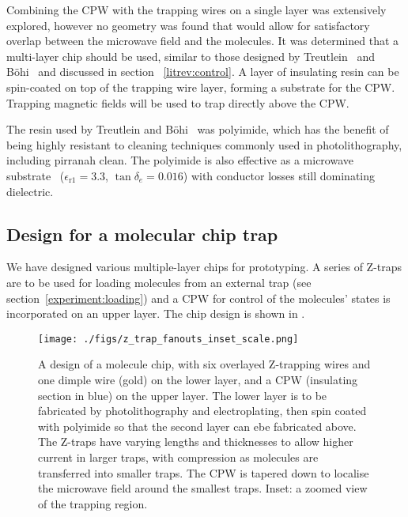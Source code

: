 Combining the CPW with the trapping wires on a single layer was extensively
explored, however no geometry was found that would allow for satisfactory
overlap between the microwave field and the molecules. It was determined that a
multi-layer chip should be used, similar to those designed
by Treutlein~\cite{Treutlein2008} and B\"ohi~\cite{rohuta} and discussed in
section ~\ref{litrev:control}.  A layer of insulating resin can be
spin-coated on top of the trapping wire layer, forming a substrate for the CPW.
Trapping magnetic fields will be used to trap directly above the CPW.

The resin used by Treutlein and B\"ohi~\cite{Treutlein2008, rohtua} was
polyimide, which has the benefit of being highly resistant to cleaning
techniques commonly used in photolithography, including pirranah clean. The
polyimide is also effective as a microwave substrate~\cite{Simons2004,
Boehi2009} ($\epsilon_\mathrm{r1} = 3.3$, $\tan\delta_e = 0.016$) with
conductor losses still dominating dielectric.

\subsection{Design for a molecular chip trap}

We have designed various multiple-layer chips for prototyping. A series of
Z-traps are to be used for loading molecules from an external trap (see
section~\ref{experiment:loading}) and a CPW for control of the molecules' states
is incorporated on an upper layer.  The chip design is shown in
.

\begin{figure}[tph]
  \texttt{[image: ./figs/z\_trap\_fanouts\_inset\_scale.png]}
  \caption{
    A design of a molecule chip, with six overlayed Z-trapping wires and one
    dimple wire (gold) on the lower layer, and a CPW (insulating section in
    blue) on the upper layer.  The lower layer is to be fabricated by
    photolithography and electroplating, then spin coated with polyimide so that
    the second layer can ebe fabricated above. The Z-traps have varying lengths
    and thicknesses to allow higher current in larger traps, with compression as
    molecules are transferred into smaller traps. The CPW is tapered down to
    localise the microwave field around the smallest traps. Inset: a zoomed view
    of the trapping region.
  }
  \label{experiment:fig:chipdesign}
\end{figure}

